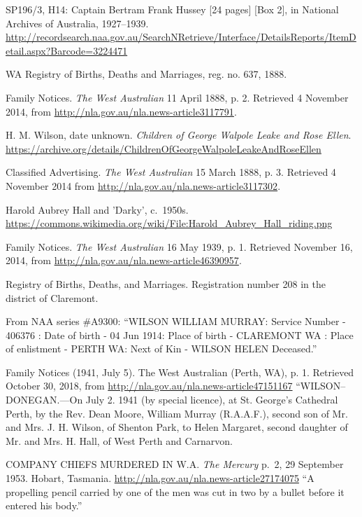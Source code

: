 \begin{thebibliography}{999}
	SP196/3, H14: Captain Bertram Frank Hussey [24 pages] [Box 2], in National Archives of Australia, 1927--1939.
	\url{http://recordsearch.naa.gov.au/SearchNRetrieve/Interface/DetailsReports/ItemDetail.aspx?Barcode=3224471}

	WA Registry of Births, Deaths and Marriages, reg. no. 637, 1888.

	Family Notices. \emph{The West Australian} 11 April 1888, p. 2. Retrieved 4 November 2014,
	from \url{http://nla.gov.au/nla.news-article3117791}.

	H. M. Wilson, date unknown. \emph{Children of George Walpole Leake and Rose Ellen}.
	\url{https://archive.org/details/ChildrenOfGeorgeWalpoleLeakeAndRoseEllen}

	Classified Advertising. \emph{The West Australian} 15 March 1888, p. 3.
	Retrieved 4 November 2014 from \url{http://nla.gov.au/nla.news-article3117302}.

	Harold Aubrey Hall and 'Darky', c.\ 1950s.
	\url{https://commons.wikimedia.org/wiki/File:Harold_Aubrey_Hall_riding.png}

	Family Notices. \emph{The West Australian} 16 May 1939, p. 1. Retrieved November 16, 2014, from \url{http://nla.gov.au/nla.news-article46390957}.

	Registry of Births, Deaths, and Marriages. Registration number 208 in the district of Claremont.

	From NAA series \#A9300: ``WILSON WILLIAM MURRAY: Service Number - 406376
	: Date of birth - 04 Jun 1914: Place of birth - CLAREMONT WA
	: Place of enlistment - PERTH WA: Next of Kin - WILSON HELEN Deceased.''

    Family Notices (1941, July 5). The West Australian (Perth, WA), p. 1.
    Retrieved October 30, 2018, from \url{http://nla.gov.au/nla.news-article47151167}
    ``WILSON--DONEGAN.---On July 2. 1941 (by special licence), at St. George's Cathedral Perth, by the Rev. Dean Moore,
    William Murray (R.A.A.F.), second son of Mr. and Mrs. J. H. Wilson, of Shenton Park,
    to Helen Margaret, second daughter of Mr. and Mrs. H. Hall, of West Perth and Carnarvon.

	 COMPANY CHIEFS MURDERED IN W.A. \emph{The Mercury} p.\ 2, 29 September 1953. Hobart, Tasmania.
	 \url{http://nla.gov.au/nla.news-article27174075}
	 ``A propelling pencil carried by one of the men was cut in two by a bullet before it entered his body.''


\end{thebibliography}
